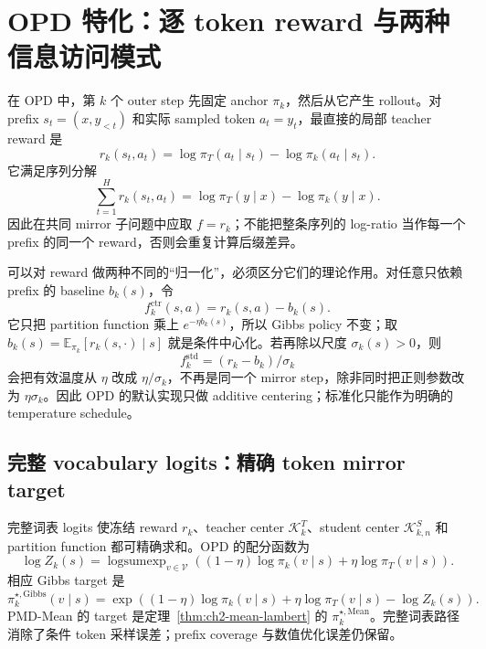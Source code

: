 \section{OPD 特化：逐 token reward 与两种信息访问模式}
\label{sec:ch2-opd-specialization}

在 OPD 中，第 $k$ 个 outer step 先固定 anchor $\pi_k$，然后从它产生 rollout。对 prefix
$s_t=(x,y_{<t})$ 和实际 sampled token $a_t=y_t$，最直接的局部 teacher reward 是
\begin{equation}
\label{eq:ch2-opd-raw-reward}
r_k(s_t,a_t)=\log\pi_T(a_t\mid s_t)-\log\pi_k(a_t\mid s_t).
\end{equation}
它满足序列分解
\[
\sum_{t=1}^H r_k(s_t,a_t)=\log\pi_T(y\mid x)-\log\pi_k(y\mid x).
\]
因此在共同 mirror 子问题中应取 $f=r_k$；不能把整条序列的 log-ratio 当作每一个 prefix 的同一个 reward，否则会重复计算后缀差异。

可以对 reward 做两种不同的“归一化”，必须区分它们的理论作用。对任意只依赖 prefix 的 baseline $b_k(s)$，令
\begin{equation}
\label{eq:ch2-opd-centered-reward}
f_k^{\mathrm{ctr}}(s,a)=r_k(s,a)-b_k(s).
\end{equation}
它只把 partition function 乘上 $e^{-\eta b_k(s)}$，所以 Gibbs policy 不变；取
$b_k(s)=\mathbb E_{\pi_k}[r_k(s,\cdot)\mid s]$ 就是条件中心化。若再除以尺度 $\sigma_k(s)>0$，则
\[
f_k^{\mathrm{std}}=(r_k-b_k)/\sigma_k
\]
会把有效温度从 $\eta$ 改成 $\eta/\sigma_k$，不再是同一个 mirror step，除非同时把正则参数改为 $\eta\sigma_k$。因此 OPD 的默认实现只做 additive centering；标准化只能作为明确的 temperature schedule。

\subsection{完整 vocabulary logits：精确 token mirror target}
\label{sec:ch2-opd-full-vocab}

完整词表 logits 使冻结 reward $r_k$、teacher center $\mathcal K_k^{T}$、student center $\mathcal K_{k,n}^{S}$ 和 partition function 都可精确求和。OPD 的配分函数为
\begin{equation}
\log Z_k(s)=\operatorname{logsumexp}_{v\in\mathcal V}
\left((1-\eta)\log\pi_k(v\mid s)+\eta\log\pi_T(v\mid s)\right).
\label{eq:ch2-opd-full-logz}
\end{equation}
相应 Gibbs target 是
\[
\pi_k^{\star,\mathrm{Gibbs}}(v\mid s)
=\exp\!\left((1-\eta)\log\pi_k(v\mid s)+\eta\log\pi_T(v\mid s)-\log Z_k(s)\right).
\]
PMD-Mean 的 target 是定理~\ref{thm:ch2-mean-lambert} 的 $\pi_k^{\star,\mathrm{Mean}}$。完整词表路径消除了条件 token 采样误差；prefix coverage 与数值优化误差仍保留。


